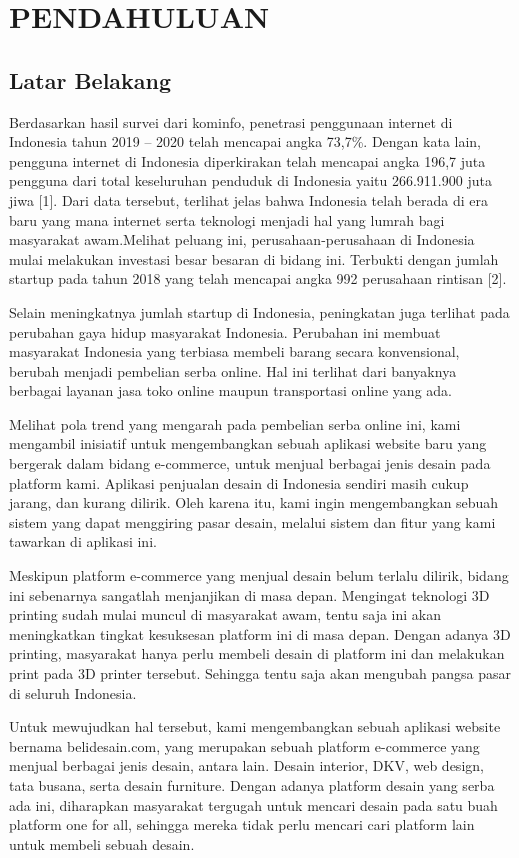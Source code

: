 \chapter{PENDAHULUAN}
\section{Latar Belakang}
Berdasarkan hasil survei dari kominfo, penetrasi penggunaan internet di Indonesia tahun 2019 – 2020 telah mencapai angka 73,7\%. Dengan kata lain, pengguna internet di Indonesia diperkirakan telah mencapai angka 196,7 juta pengguna dari total keseluruhan penduduk di Indonesia yaitu 266.911.900 juta jiwa [1]. Dari data tersebut, terlihat jelas bahwa Indonesia telah berada di era baru yang mana internet serta teknologi menjadi hal yang lumrah bagi masyarakat awam.Melihat peluang ini, perusahaan-perusahaan di Indonesia mulai melakukan investasi besar besaran di bidang ini. Terbukti dengan jumlah startup pada tahun 2018 yang telah mencapai angka 992 perusahaan rintisan [2].
\par
Selain meningkatnya jumlah startup di Indonesia, peningkatan juga terlihat pada perubahan gaya hidup masyarakat Indonesia. Perubahan ini membuat masyarakat Indonesia yang terbiasa membeli barang secara konvensional, berubah menjadi pembelian serba online. Hal ini terlihat dari banyaknya berbagai layanan jasa toko online maupun transportasi online yang ada. 
\par
Melihat pola trend yang mengarah pada pembelian serba online ini, kami mengambil inisiatif untuk mengembangkan sebuah aplikasi website baru yang bergerak dalam bidang e-commerce, untuk menjual berbagai jenis desain pada platform kami. Aplikasi penjualan desain di Indonesia sendiri masih cukup jarang, dan kurang dilirik. Oleh karena itu, kami ingin mengembangkan sebuah sistem yang dapat menggiring pasar desain, melalui sistem dan fitur yang kami tawarkan di aplikasi ini.
\par
Meskipun platform e-commerce yang menjual desain belum terlalu dilirik, bidang ini sebenarnya sangatlah menjanjikan di masa depan. Mengingat teknologi 3D printing sudah mulai muncul di masyarakat awam, tentu saja ini akan meningkatkan tingkat kesuksesan platform ini di masa depan. Dengan adanya 3D printing, masyarakat hanya perlu membeli desain di platform ini dan melakukan print pada 3D printer tersebut. Sehingga tentu saja akan mengubah pangsa pasar di seluruh Indonesia.
\par
Untuk mewujudkan hal tersebut, kami mengembangkan sebuah aplikasi website bernama belidesain.com, yang merupakan sebuah platform e-commerce yang menjual berbagai jenis desain, antara lain. Desain interior, DKV, web design, tata busana, serta desain furniture. Dengan adanya platform desain yang serba ada ini, diharapkan masyarakat tergugah untuk mencari desain pada satu buah platform one for all, sehingga mereka tidak perlu mencari cari platform lain untuk membeli sebuah desain.
